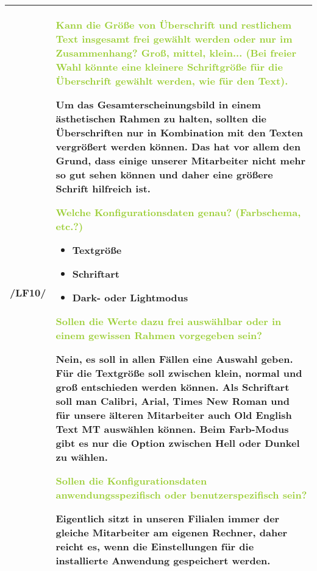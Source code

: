 \begin{tabular}{l | p{13cm}}
    \hline
    /LF10/ & \textcolor{YellowGreen}{Kann die Größe von Überschrift und restlichem Text insgesamt frei gewählt werden oder nur im Zusammenhang? Groß, mittel, klein... (Bei freier Wahl könnte eine kleinere Schriftgröße für die Überschrift gewählt werden, wie für den Text).}

    \textcolor{NavyBlue}{Um das Gesamterscheinungsbild in einem ästhetischen Rahmen zu halten, sollten die Überschriften nur in Kombination mit den Texten vergrößert werden können. Das hat vor allem den Grund, dass einige unserer Mitarbeiter nicht mehr so gut sehen können und daher eine größere Schrift hilfreich ist.}

    \textcolor{YellowGreen}{Welche Konfigurationsdaten genau? (Farbschema, etc.?)}

    \textcolor{NavyBlue}{
        \begin{itemize}
            \item Textgröße
            \item Schriftart
            \item Dark- oder Lightmodus
        \end{itemize}
    }

    \textcolor{YellowGreen}{Sollen die Werte dazu frei auswählbar oder in einem gewissen Rahmen vorgegeben sein?}

    \textcolor{NavyBlue}{Nein, es soll in allen Fällen eine Auswahl geben. Für die Textgröße soll zwischen klein, normal und groß entschieden werden können.
    Als Schriftart soll man \grqq{}Calibri\grqq{}, \grqq{}Arial\grqq{}, \grqq{}Times New Roman\grqq{} und für unsere älteren Mitarbeiter auch \grqq{}Old English Text MT\grqq{} auswählen können. Beim Farb-Modus gibt es nur die Option zwischen \grqq{}Hell\grqq{} oder \grqq{}Dunkel\grqq{} zu wählen.}

    \textcolor{YellowGreen}{Sollen die Konfigurationsdaten anwendungsspezifisch oder benutzerspezifisch sein?} 
    
    \textcolor{NavyBlue}{Eigentlich sitzt in unseren Filialen immer der gleiche Mitarbeiter am eigenen Rechner, daher reicht es, wenn die Einstellungen für die installierte Anwendung gespeichert werden.}
    \\
    \hline
\end{tabular}

